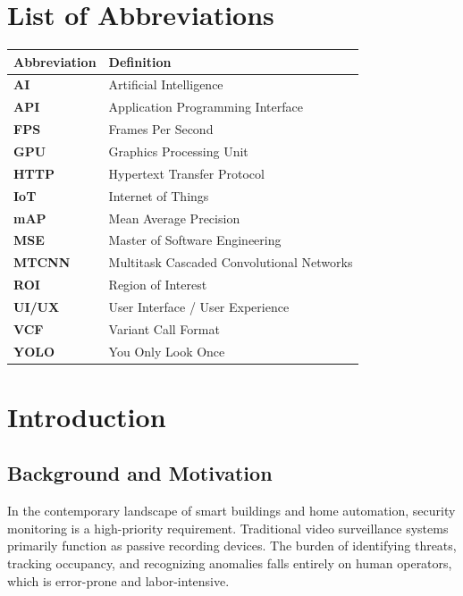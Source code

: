 \documentclass[12pt,a4paper]{article}
\begin{document}
\newpage

\tableofcontents
\newpage

\section*{List of Abbreviations}

\begin{longtable}{lp{11.5cm}}
\toprule
\textbf{Abbreviation} & \textbf{Definition} \\
\midrule
\endhead
\textbf{AI} & Artificial Intelligence \\
\textbf{API} & Application Programming Interface \\
\textbf{FPS} & Frames Per Second \\
\textbf{GPU} & Graphics Processing Unit \\
\textbf{HTTP} & Hypertext Transfer Protocol \\
\textbf{IoT} & Internet of Things \\
\textbf{mAP} & Mean Average Precision \\
\textbf{MSE} & Master of Software Engineering \\
\textbf{MTCNN} & Multitask Cascaded Convolutional Networks \\
\textbf{ROI} & Region of Interest \\
\textbf{UI/UX} & User Interface / User Experience \\
\textbf{VCF} & Variant Call Format \\
\textbf{YOLO} & You Only Look Once \\
\bottomrule
\end{longtable}

\newpage

\section{Introduction}

\subsection{Background and Motivation}
In the contemporary landscape of smart buildings and home automation, security monitoring is a high-priority requirement. Traditional video surveillance systems primarily function as passive recording devices. The burden of identifying threats, tracking occupancy, and recognizing anomalies falls entirely on human operators, which is error-prone and labor-intensive. 
\end{document}
